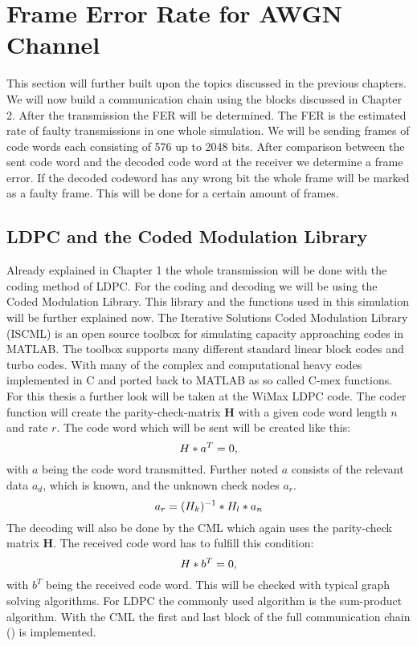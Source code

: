 \chapter{Frame Error Rate for AWGN Channel}
 \label{chap:AWGN chain}
\graphicspath{{C:/Users/Kevin/Bachelarbeit/Bachelorarbeit/01_Bachelorarbeit_LaTex/02_Figures/}}

This section will further built upon the topics discussed in the previous chapters. We will now build a communication chain using the blocks discussed in Chapter 2. After the transmission the \gls{FER} will be determined. The \gls{FER} is the estimated rate of faulty transmissions in one whole simulation. We will be sending frames of code words each consisting of 576 up to 2048 bits. After comparison between the sent code word and the decoded code word at the receiver we determine a frame error. If the decoded codeword has any wrong bit the whole frame will be marked as a faulty frame. This will be done for a certain amount of frames.

\section{LDPC and the Coded Modulation Library}
Already explained in Chapter 1 the whole transmission will be done with the coding method of \gls{LDPC}. For the coding and decoding we will be using the Coded Modulation Library. This library and the functions used in this simulation will be further explained now.
\newline
The Iterative Solutions Coded Modulation Library (ISCML) is an open source toolbox for simulating capacity approaching codes in MATLAB\cite{CML}. The toolbox supports many different standard linear block codes and turbo codes. With many of the complex and computational heavy codes implemented in C and ported back to MATLAB as so called C-mex functions\cite{CML}.
\newline 
For this thesis a further look will be taken at the WiMax LDPC code. The coder function will create the parity-check-matrix \textbf{H} with a given code word length $n$ and rate $r$. The code word which will be sent will be created like this:
\begin{equation}
\label{eq:LDPC1}
\boldmath{H}*a^T = 0,
\end{equation}
with $a$ being the code word transmitted. Further noted $a$ consists of the relevant data $a_{d}$, which is known, and the unknown check nodes $a_{r}$. 
\begin{equation}
\label{eq:LDPC2}
a_r = (\boldmath{H}_k)^{-1} * H_l * a_n
\end{equation}
The decoding will also be done by the \gls{CML} which again uses the parity-check matrix \textbf{H}. The received code word has to fulfill this condition:
\begin{equation}
\label{eq:LDPC3}
\boldmath{H}*b^T = 0,
\end{equation}
with $b^T$ being the received code word. This will be checked with typical graph solving algorithms. For LDPC the commonly used algorithm is the sum-product algorithm.
With the \gls{CML} the first and last block of the full communication chain () is implemented.
